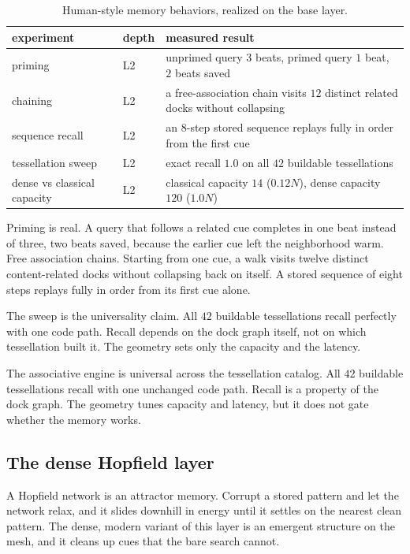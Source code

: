 \begin{table}[ht]
\centering
\begin{tabular}{@{}lll@{}}
\toprule
experiment & depth & measured result \\
\midrule
priming & L2 & unprimed query $3$ beats, primed query $1$ beat, $2$ beats saved \\
chaining & L2 & a free-association chain visits $12$ distinct related docks without collapsing \\
sequence recall & L2 & an $8$-step stored sequence replays fully in order from the first cue \\
tessellation sweep & L2 & exact recall $1.0$ on all $42$ buildable tessellations \\
dense vs classical capacity & L2 & classical capacity $14$ ($0.12N$), dense capacity $120$ ($1.0N$) \\
\bottomrule
\end{tabular}
\caption{Human-style memory behaviors, realized on the base layer.}
\label{tab:human-memory}
\end{table}

Priming is real. A query that follows a related cue completes in one beat instead of three, two beats saved, because the earlier cue left the neighborhood warm. Free association chains. Starting from one cue, a walk visits twelve distinct content-related docks without collapsing back on itself. A stored sequence of eight steps replays fully in order from its first cue alone.

The sweep is the universality claim. All $42$ buildable tessellations recall perfectly with one code path. Recall depends on the dock graph itself, not on which tessellation built it. The geometry sets only the capacity and the latency.

\begin{principle}
The associative engine is universal across the tessellation catalog. All $42$ buildable tessellations recall with one unchanged code path. Recall is a property of the dock graph. The geometry tunes capacity and latency, but it does not gate whether the memory works.
\end{principle}

\subsection{The dense Hopfield layer}

A Hopfield network is an attractor memory. Corrupt a stored pattern and let the network relax, and it slides downhill in energy until it settles on the nearest clean pattern. The dense, modern variant of this layer is an emergent structure on the mesh, and it cleans up cues that the bare search cannot.

